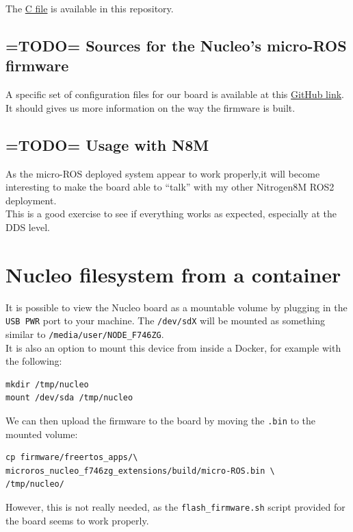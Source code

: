 \documentclass[10pt]{article}
\begin{document}
The \href{https://gitlab.com/nucleo-144/documentation/-/blob/main/src/ping_pong.c}{C file} is available in this repository.


\subsection{=TODO= Sources for the Nucleo's micro-ROS firmware}
\label{sec:sourc-nucl-micro}
A specific set of configuration files for our board is available at this \href{https://github.com/micro-ROS/micro_ros_setup/tree/humble/config/freertos/nucleo_f746zg}{GitHub link}.\\
It should gives us more information on the way the firmware is built.


\subsection{=TODO= Usage with N8M}
\label{sec:usage-with-n8m}
As the micro-ROS deployed system appear to work properly,it will become interesting
to make the board able to ``talk'' with my other Nitrogen8M ROS2 deployment.\\

This is a good exercise to see if everything works as expected, especially at
the DDS level.

\pagebreak
\appendix

\section{Nucleo filesystem from a container}
\label{appendix:nucl-filesyst-from}
It is possible to view the Nucleo board as a mountable volume by plugging in the \verb|USB PWR| port to your machine. The \verb|/dev/sdX| will be mounted as something similar to \verb|/media/user/NODE_F746ZG|.\\
It is also an option to mount this device from inside a Docker, for example with the following:
\begin{tcolorbox}
\begin{verbatim}
mkdir /tmp/nucleo
mount /dev/sda /tmp/nucleo
\end{verbatim}
\end{tcolorbox}

We can then upload the firmware to the board by moving the \verb|.bin| to the mounted volume:
\begin{tcolorbox}
\begin{verbatim}
cp firmware/freertos_apps/\
microros_nucleo_f746zg_extensions/build/micro-ROS.bin \
/tmp/nucleo/
\end{verbatim}
\end{tcolorbox}

However, this is not really needed, as the \verb|flash_firmware.sh| script provided for the board seems to work properly.
\end{document}
